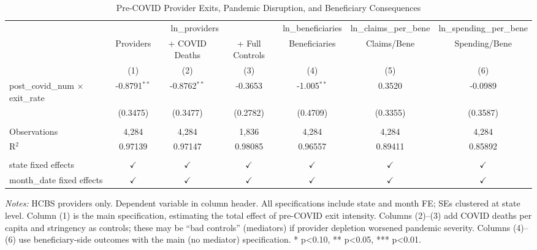 
\begin{table}[htbp]
   \caption{\label{tab:main} Pre-COVID Provider Exits, Pandemic Disruption, and Beneficiary Consequences}
   \bigskip
   \centering
   \begin{tabular}{lcccccc}
      \toprule
       & \multicolumn{3}{c}{ln\_providers} & ln\_beneficiaries & ln\_claims\_per\_bene & ln\_spending\_per\_bene\\
                                               & Providers      & + COVID Deaths & + Full Controls & Beneficiaries & Claims/Bene   & Spending/Bene \\   
                                               & (1)            & (2)            & (3)             & (4)           & (5)           & (6)\\  
      \midrule 
      post\_covid\_num $\times$ exit\_rate     & -0.8791$^{**}$ & -0.8762$^{**}$ & -0.3653         & -1.005$^{**}$ & 0.3520        & -0.0989\\   
                                               & (0.3475)       & (0.3477)       & (0.2782)        & (0.4709)      & (0.3355)      & (0.3587)\\   
       \\
      Observations                             & 4,284          & 4,284          & 1,836           & 4,284         & 4,284         & 4,284\\  
      R$^2$                                    & 0.97139        & 0.97147        & 0.98085         & 0.96557       & 0.89411       & 0.85892\\  
       \\
      state fixed effects                      & $\checkmark$   & $\checkmark$   & $\checkmark$    & $\checkmark$  & $\checkmark$  & $\checkmark$\\   
      month\_date fixed effects                & $\checkmark$   & $\checkmark$   & $\checkmark$    & $\checkmark$  & $\checkmark$  & $\checkmark$\\   
      \bottomrule
   \end{tabular}
   
   \par \raggedright 
   \textit{Notes:} HCBS providers only. Dependent variable in column header. All specifications include state and month FE; SEs clustered at state level. Column (1) is the main specification, estimating the total effect of pre-COVID exit intensity. Columns (2)--(3) add COVID deaths per capita and stringency as controls; these may be ``bad controls'' (mediators) if provider depletion worsened pandemic severity. Columns (4)--(6) use beneficiary-side outcomes with the main (no mediator) specification. * p<0.10, ** p<0.05, *** p<0.01.
\end{table}


